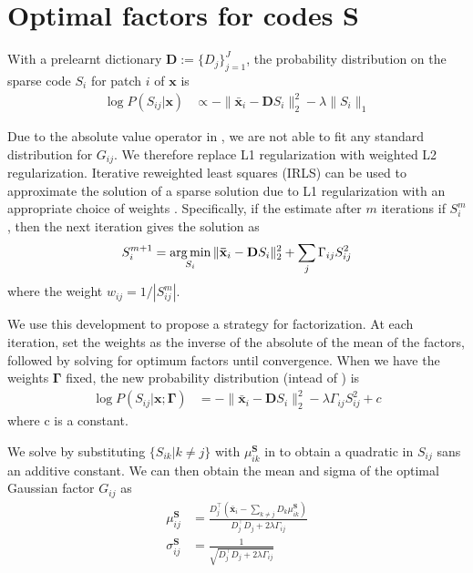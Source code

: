 \chapter{Optimal factors for codes $\mathbf{S}$ }
\label{app:factorParamsS}

With a prelearnt dictionary $\mathbf{D} := \lbrace D_j \rbrace_{j=1}^{J}$, the probability distribution on the sparse code $S_i$ for patch $i$ of $\mathbf{x}$ is
\begin{align}
\log P(S_{ij} | \mathbf{x}) &\propto - \| \mathbf{\bar{x}}_i - \mathbf{D} S_i \|_2^2 - \lambda \| S_i \|_1 \label{eqn:deriveSFactors}
\end{align}

Due to the absolute value operator in , we are not able to fit any standard distribution for $G_{ij}$. We therefore replace L1 regularization with weighted L2 regularization. Iterative reweighted least squares (IRLS) can be used to approximate the solution of a sparse solution due to L1 regularization with an appropriate choice of weights \cite{chartrand2008iteratively}. Specifically, if the estimate after $m$ iterations if $S^m_i$, then the next iteration gives the solution as
\begin{align}
S^{m+1}_i = \operatorname*{arg\,min}_{S_i} \| \mathbf{\bar{x}}_i - \mathbf{D} S_i \|^2_2 + \sum_{j} \Gamma_{ij} S_{ij}^2
\end{align}
where the weight $w_{ij} = 1/| S^m_{ij} |$.

We use this development to propose a strategy for factorization. At each iteration, set the weights as the inverse of the absolute of the mean of the factors, followed by solving for optimum factors until convergence. When we have the weights $\mathbf{\Gamma}$ fixed, the new probability distribution (intead of ) is
\begin{align}
\log P(S_{ij} | \mathbf{x}; \mathbf{\Gamma}) &= - \| \mathbf{\bar{x}}_i - \mathbf{D} S_i \|_2^2 - \lambda \Gamma_{ij} S_{ij}^2 + c \label{eqn:deriveSFactors2}
\end{align}
where c is a constant.

We solve  by substituting $\lbrace S_{ik} | k \neq j \rbrace$ with $\mu^\mathbf{S}_{ik}$ in  to obtain a quadratic in $S_{ij}$ sans an additive constant. We can then obtain the mean and sigma of the optimal Gaussian factor $G_{ij}$ as
\begin{align}
\mu^\mathbf{S}_{ij} &= \frac{ D_j^\intercal \left( \mathbf{\bar{x}}_i - \sum_{k \neq j} D_k \mu^\mathbf{S}_{ik} \right) }{ D_j^\intercal D_j + 2 \lambda \Gamma_{ij} } \\
\sigma^\mathbf{S}_{ij} &= \frac{1}{\sqrt{ D_j^\intercal D_j + 2 \lambda \Gamma_{ij} }}
\end{align}